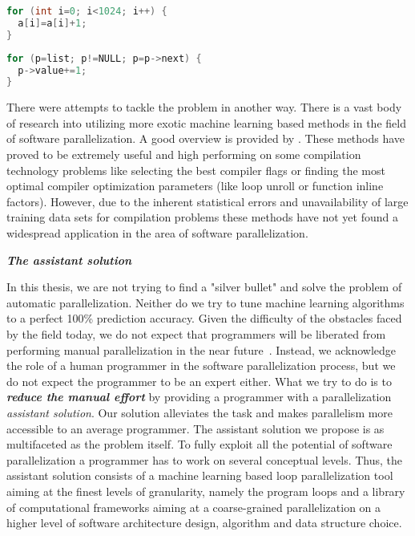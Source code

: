 \begin{description}[style=unboxed,leftmargin=0cm]
\begin{minipage}[t]{0.5\linewidth}
\begin{lstlisting}[caption={\raggedright Parallelizable loop operating on a \textbf{flat array}.},label={lst:introduction_array},language=C]
for (int i=0; i<1024; i++) {
  a[i]=a[i]+1;
}
\end{lstlisting}
\end{minipage}
%
\begin{minipage}[t]{0.5\linewidth}
\begin{lstlisting}[caption={\raggedright Non-parallelizable loop operating on a \textbf{linked-list}.},label={lst:introduction_list},language=C]
for (p=list; p!=NULL; p=p->next) {
  p->value+=1;
}
\end{lstlisting}
\end{minipage}
\item[\textit{Machine learning based parallelization applicability}] There were attempts to tackle the problem in another way. There is a vast body of research into utilizing more exotic machine learning based methods in the field of software parallelization. A good overview is provided by \cite{ml-oboyle}. These methods have proved to be extremely useful and high performing on some compilation technology problems like selecting the best compiler flags or finding the most optimal compiler optimization parameters (like loop unroll or function inline factors). However, due to the inherent statistical errors and unavailability of large training data sets for compilation problems these methods have not yet found a widespread application in the area of software parallelization.
\end{description}
\begin{center}
\textbf{\large \textit{The assistant solution}}
\end{center}
\quad In this thesis, we are not trying to find a "silver bullet" and solve the problem of automatic parallelization. Neither do we try to tune machine learning algorithms to a perfect 100\% prediction accuracy. Given the difficulty of the obstacles faced by the field today, we do not expect that programmers will be liberated from performing manual parallelization in the near future~\cite{Larsen:2012:PML:2410141.2410600}. Instead, we acknowledge the role of a human programmer in the software parallelization process, but we do not expect the programmer to be an expert either. What we try to do is to \textit{\textbf{reduce the manual effort}} by providing a programmer with a parallelization \textit{assistant solution}. Our solution alleviates the task and makes parallelism more accessible to an average programmer. The assistant solution we propose is as multifaceted as the problem itself. To fully exploit all the potential of software parallelization a programmer has to work on several conceptual levels. Thus, the assistant solution consists of a machine learning based loop parallelization tool \cite{assistant-aiseps} aiming at the finest levels of granularity, namely the program loops and a library of computational frameworks \cite{frameworks-repo} aiming at a coarse-grained parallelization on a higher level of software architecture design, algorithm and data structure choice.
